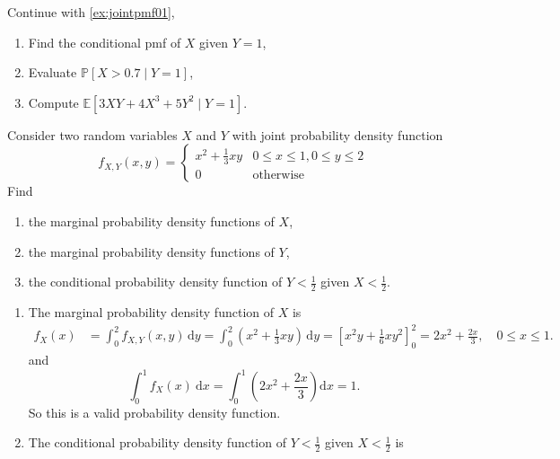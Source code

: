 \begin{example}
    Continue with \cref{ex:jointpmf01}, 
    \begin{enumerate}
        \item Find the conditional pmf of $X$ given $Y = 1$,
        \item Evaluate $\mathbb{P}[X > 0.7 \mid Y = 1]$,
        \item Compute $\mathbb{E}[3XY + 4X^3 + 5Y^2 \mid Y = 1]$.
    \end{enumerate}
\end{example}

\begin{example}
    Consider two random variables $X$ and $Y$ with joint probability density function
    \[
        f_{X,Y} (x,y) = \begin{cases}
            x^2 + \frac{1}{3}xy & 0 \leq x \leq 1, 0 \leq y \leq 2\\
            0 & \text{otherwise}
        \end{cases}
    \]
    Find
    \begin{enumerate}
        \item the marginal probability density functions of $X$,
        \item the marginal probability density functions of $Y$,
        \item the conditional probability density function of $Y < \frac{1}{2}$ given $X<\frac{1}{2}$.
    \end{enumerate}
\end{example}
\begin{solution}
    \begin{enumerate}
        \item The marginal probability density function of $X$ is 
        \begin{align*}
            f_X(x) &= \int^2_0 f_{X,Y}(x,y) \, \mathrm{d}y = 
            \int^2_0 \left( x^2 + \frac{1}{3}xy \right) \, \mathrm{d}y = \left[ x^2 y + \frac{1}{6}xy^2 \right]^2_0 = 2x^2 + \frac{2x}{3}, \quad 0 \leq x \leq 1.
        \end{align*}
        and \[\int^1_0 f_X(x) \> \mathrm{d}x = \int_{0}^{1} \left(2x^2 + \frac{2x}{3}\right) \mathrm{d}x = 1. \]
        So this is a valid probability density function.
        \item The conditional probability density function of $Y < \frac{1}{2}$ given $X<\frac{1}{2}$ is 
    \end{enumerate}
\end{solution}

